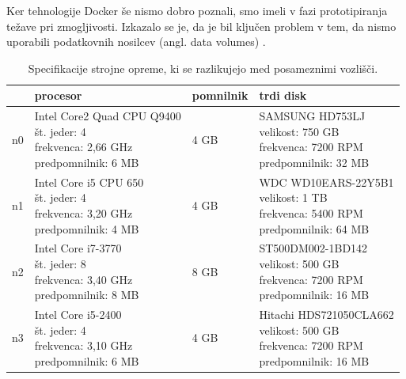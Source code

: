\documentclass[a4paper, 12pt]{book}
\begin{document}
Ker tehnologije Docker še nismo dobro poznali, smo imeli v fazi prototipiranja težave pri zmogljivosti. Izkazalo se je, da je bil ključen problem v tem, da nismo uporabili podatkovnih nosilcev (angl. data volumes) \cite{docker-storage-layers}.

\begin{table}[H]
\begin{center}
\begin{tabular}{ l|l|l|l } 
    & \textbf{procesor} & \textbf{pomnilnik} & \textbf{trdi disk} \\
\hline
n0 & \makecell[l]{Intel Core2 Quad CPU Q9400\\št. jeder: 4\\frekvenca: 2,66 GHz\\predpomnilnik: 6 MB} & 4 GB & \makecell[l]{SAMSUNG HD753LJ\\velikost: 750 GB\\frekvenca: 7200 RPM\\predpomnilnik: 32 MB} \\
\hline
n1 & \makecell[l]{Intel Core i5 CPU 650\\št. jeder: 4\\frekvenca: 3,20 GHz\\predpomnilnik: 4 MB} & 4 GB & \makecell[l]{WDC WD10EARS-22Y5B1\\velikost: 1 TB\\frekvenca: 5400 RPM\\predpomnilnik: 64 MB} \\
\hline
n2 & \makecell[l]{Intel Core i7-3770\\št. jeder: 8\\frekvenca: 3,40 GHz\\predpomnilnik: 8 MB} & 8 GB & \makecell[l]{ST500DM002-1BD142\\velikost: 500 GB\\frekvenca: 7200 RPM\\predpomnilnik: 16 MB} \\
\hline
n3 & \makecell[l]{Intel Core i5-2400\\št. jeder: 4\\frekvenca:  3,10 GHz \\predpomnilnik: 6 MB} & 4 GB & \makecell[l]{Hitachi HDS721050CLA662\\velikost: 500 GB\\frekvenca: 7200 RPM\\predpomnilnik: 16 MB} \\
\end{tabular}
\end{center}
\caption{Specifikacije strojne opreme, ki se razlikujejo med posameznimi vozlišči.}
\label{tbl_benchmarking_nodes_hw}
\end{table}
\end{document}

